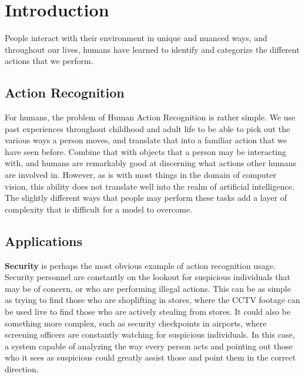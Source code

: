 
\chapter{Introduction} %

\label{Chapter1} %

People interact with their environment in unique and nuanced ways, and throughout our lives, humans have learned to identify and categorize the different actions that we perform.

\section{Action Recognition}

For humans, the problem of Human Action Recognition is rather simple. We use past experiences throughout childhood and adult life to be able to pick out the various ways a person moves, and translate that into a familiar action that we have seen before. Combine that with objects that a person may be interacting with, and humans are remarkably good at discerning what actions other humans are involved in. However, as is with most things in the domain of computer vision, this ability does not translate well into the realm of artificial intelligence. The slightly different ways that people may perform these tasks add a layer of complexity that is difficult for a model to overcome.

\section{Applications}

\textbf{Security} is perhaps the most obvious example of action recognition usage. Security personnel are constantly on the lookout for suspicious individuals that may be of concern, or who are performing illegal actions. This can be as simple as trying to find those who are shoplifting in stores, where the CCTV footage can be used live to find those who are actively stealing from stores. It could also be something more complex, such as security checkpoints in airports, where screening officers are constantly watching for suspicious individuals. In this case, a system capable of analyzing the way every person acts and pointing out those who it sees as suspicious could greatly assist those and point them in the correct direction.

